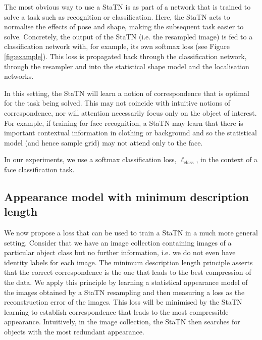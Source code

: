 \documentclass[runningheads]{llncs}
\begin{document}
The most obvious way to use a StaTN is as part of a network that is trained to solve a task such as recognition or classification. Here, the StaTN acts to normalise the effects of pose and shape, making the subsequent task easier to solve. Concretely, the output of the StaTN (i.e. the resampled image) is fed to a classification network with, for example, its own softmax loss (see Figure \ref{fig:example}). This loss is propagated back through the classification network, through the resampler and into the statistical shape model and the localisation networks.

In this setting, the StaTN will learn a notion of correspondence that is optimal for the task being solved. This may not coincide with intuitive notions of correspondence, nor will attention necessarily focus only on the object of interest. For example, if training for face recognition, a StaTN may learn that there is important contextual information in clothing or background and so the statistical model (and hence sample grid) may not attend only to the face.

In our experiments, we use a softmax classification loss, $\ell_{\textrm{class}}$, in the context of a face classification task.

\subsection{Appearance model with minimum description length}

We now propose a loss that can be used to train a StaTN in a much more general setting. Consider that we have an image collection containing images of a particular object class but no further information, i.e. we do not even have identity labels for each image. The minimum description length principle \cite{davies2002minimum} asserts that the correct correspondence is the one that leads to the best compression of the data. We apply this principle by learning a statistical appearance model of the images obtained by a StaTN resampling and then measuring a loss as the reconstruction error of the images. This loss will be minimised by the StaTN learning to establish correspondence that leads to the most compressible appearance. Intuitively, in the image collection, the StaTN then searches for objects with the most redundant appearance. 
\end{document}
